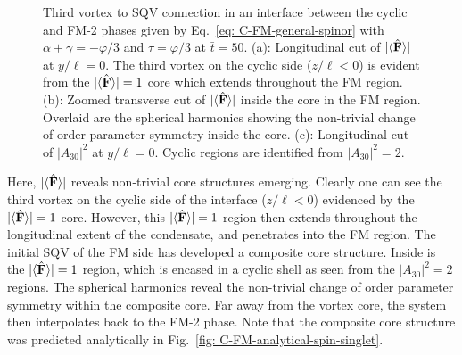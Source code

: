 \begin{figure}[htb!]
    \caption{\label{fig: C-FM-third-SQV}Third vortex to SQV connection in an
    interface between the cyclic and FM-2 phases given by
    Eq.~\eqref{eq: C-FM-general-spinor} with \(\alpha + \gamma = -\varphi/3\)
    and \(\tau = \varphi/3\) at \(\bar{t} = 50\).
    (a): Longitudinal cut of \(|\langle \hat{\vb{F}} \rangle | \) at \(y/\ell=0\).
    The third vortex on the cyclic side (\(z/\ell < 0\)) is evident from the
    \(|\langle \hat{\vb{F}} \rangle | = 1\) core which extends throughout the FM region.
    (b): Zoomed transverse cut of \(|\langle \hat{\vb{F}} \rangle | \) inside the core in the FM
    region.
    Overlaid are the spherical harmonics showing the non-trivial change
    of order parameter symmetry inside the core.
    (c): Longitudinal cut of \(|A_{30}|^2\) at \(y/\ell=0\).
    Cyclic regions are identified from \(|A_{30}|^2=2\).}
\end{figure}
Here, \(|\langle \hat{\vb{F}} \rangle | \) reveals non-trivial core structures emerging.
Clearly one can see the third vortex on the cyclic side of the interface
(\(z/\ell < 0\)) evidenced by the \(|\langle \hat{\vb{F}} \rangle | = 1\) core.
However, this \(|\langle \hat{\vb{F}} \rangle | = 1\) region then extends throughout the longitudinal
extent of the condensate, and penetrates into the FM region.
The initial SQV of the FM side has developed a composite core structure.
Inside is the \(|\langle \hat{\vb{F}} \rangle | = 1\) region, which is encased in a cyclic shell as
seen from the \(|A_{30}|^2=2\) regions.
The spherical harmonics reveal the non-trivial change of order parameter
symmetry within the composite core.
Far away from the vortex core, the system then interpolates back to the FM-2
phase.
Note that the composite core structure was predicted analytically in
Fig.~\ref{fig: C-FM-analytical-spin-singlet}.

